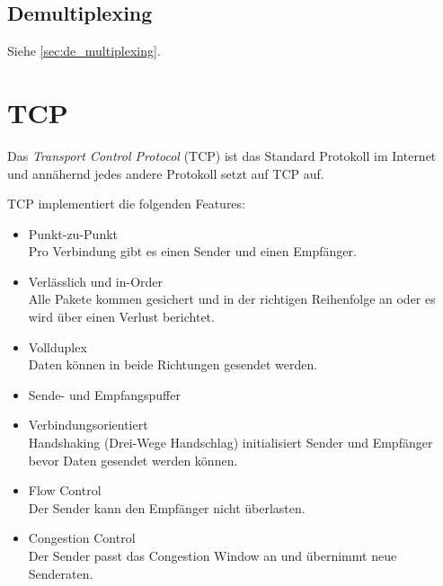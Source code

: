 \documentclass[a4paper, 11pt, accentcolor = tud3b]{tudreport}
\begin{document}
            \subsection{Demultiplexing} %
	            Siehe \ref{sec:de_multiplexing}.

        \section{TCP}
	        Das \textit{Transport Control Protocol} (TCP) ist das Standard Protokoll im Internet und annähernd jedes andere Protokoll setzt auf TCP auf.
	        
	        TCP implementiert die folgenden Features:
	        \begin{itemize}
	        	\item Punkt-zu-Punkt \\ Pro Verbindung gibt es einen Sender und einen Empfänger.
	        	\item Verlässlich und in-Order \\ Alle Pakete kommen gesichert und in der richtigen Reihenfolge an oder es wird über einen Verlust berichtet.
	        	\item Vollduplex \\ Daten können in beide Richtungen gesendet werden.
	        	\item Sende- und Empfangspuffer
	        	\item Verbindungsorientiert \\ Handshaking (Drei-Wege Handschlag) initialisiert Sender und Empfänger bevor Daten gesendet werden können.
	        	\item Flow Control \\ Der Sender kann den Empfänger nicht überlasten.
	        	\item Congestion Control \\ Der Sender passt das Congestion Window an und übernimmt neue Senderaten.
	        \end{itemize}
\end{document}
